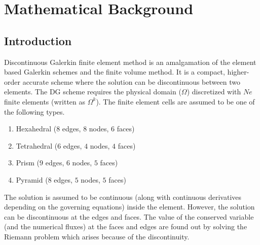 \chapter{Mathematical Background}\label{math}
\section{Introduction}
Discontinuous Galerkin finite element method is an amalgamation of the element based Galerkin schemes and
the finite volume method. It is a compact, higher-order accurate scheme where the solution can be 
discontinuous between two elements.
The DG scheme requires the physical domain ($\Omega$) discretized with $Ne$ finite elements (written as $\Omega^k$). 
The finite element cells are assumed to be one of the following types.
\begin{enumerate}
	\item Hexahedral ($8$ edges, $8$ nodes, $6$ faces)
	\item Tetrahedral ($6$ edges, $4$ nodes, $4$ faces)
	\item Prism ($9$ edges, $6$ nodes, $5$ faces)
	\item Pyramid ($8$ edges, $5$ nodes, $5$ faces)
\end{enumerate}
The solution is assumed to be continuous (along with continuous derivatives depending on the governing equations) inside 
the element. However, the solution can be discontinuous at the edges and faces. The value of the conserved variable (and 
the numerical fluxes) at the faces and edges are found out by solving the Riemann problem which arises because of the 
discontinuity. 

